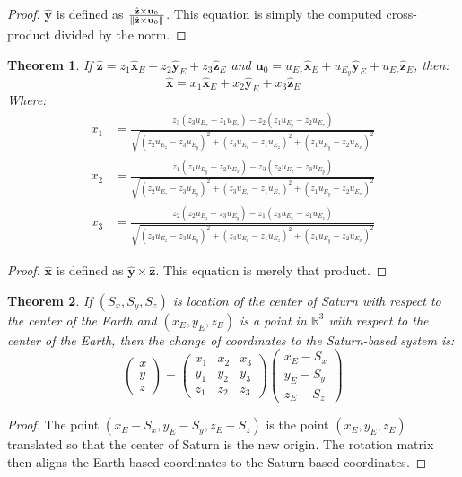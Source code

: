 \documentclass{article}
\theoremstyle{mystyle}
\newtheorem{theorem}{Theorem}[section]
\DeclarePairedDelimiter\norm{\lVert}{\rVert}
\begin{document}
\begin{proof}
$\hat{\mathbf{y}}$ is defined as $\frac{\hat{\mathbf{z}}\times \mathbf{u}_{0}}{\norm{\hat{\mathbf{z}}\times \mathbf{u}_{0}}}$. This equation is simply the computed cross-product divided by the norm.
\end{proof}
\begin{theorem}
If $\hat{\mathbf{z}} = z_1\hat{\mathbf{x}}_{E}+z_2\hat{\mathbf{y}}_{E}+z_3\hat{\mathbf{z}}_{E}$ and $\mathbf{u}_{0} = u_{E_{x}}\hat{\mathbf{x}}_{E}+u_{E_{y}}\hat{\mathbf{y}}_{E}+u_{E_{z}}\hat{\mathbf{z}}_{E}$, then:
\begin{equation*}
\hat{\mathbf{x}} = x_1 \hat{\mathbf{x}}_{E}+x_2\hat{\mathbf{y}}_{E}+x_3\hat{\mathbf{z}}_{E}
\end{equation*}
Where:
\begin{align*}
x_1 &= \frac{z_3(z_{3}u_{E_{x}}-z_1u_{E_{z}})-z_2(z_1u_{E_{y}}-z_2u_{E_{x}})}{\sqrt{(z_2u_{E_{z}}-z_3u_{E_{y}})^2+(z_3u_{E_{x}}-z_1u_{E_{z}})^2+(z_1u_{E_{y}}-z_2u_{E_{x}})^2}}\\
x_2 &= \frac{z_1(z_{1}u_{E_{y}}-z_{2}u_{E_{x}})-z_{3}(z_{2}u_{E_{z}}-z_{3}u_{E_{y}})}{\sqrt{(z_2u_{E_{z}}-z_3u_{E_{y}})^2+(z_3u_{E_{x}}-z_1u_{E_{z}})^2+(z_1u_{E_{y}}-z_2u_{E_{x}})^2}}\\
x_3 &= \frac{z_2(z_2u_{E_{z}}-z_3u_{E_{y}})-z_1(z_{3}u_{E_{x}}-z_{1}u_{E_{z}})}{\sqrt{(z_2u_{E_{z}}-z_3u_{E_{y}})^2+(z_3u_{E_{x}}-z_1u_{E_{z}})^2+(z_1u_{E_{y}}-z_2u_{E_{x}})^2}}
\end{align*}
\end{theorem}
\begin{proof}
$\hat{\mathbf{x}}$ is defined as $\hat{\mathbf{y}}\times \hat{\mathbf{z}}$. This equation is merely that product.
\end{proof}
\begin{theorem}
If $(S_x,S_y,S_z)$ is location of the center of Saturn with respect to the center of the Earth and $(x_{E},y_{E},z_{E})$ is a point in $\mathbb{R}^3$ with respect to the center of the Earth, then the change of coordinates to the Saturn-based system is:
\begin{equation*}
\begin{pmatrix} x\\y\\z \end{pmatrix} = \begin{pmatrix} x_1 & x_2 & x_3 \\ y_1 & y_2 & y_3 \\ z_1 & z_2 & z_3 \end{pmatrix} \begin{pmatrix} x_{E}-S_{x} \\ y_{E}-S_{y} \\ z_{E} - S_{z}\end{pmatrix}
\end{equation*}
\end{theorem}
\begin{proof}
The point $(x_{E}-S_{x}, y_{E}-S_{y}, z_{E}-S_{z})$ is the point $(x_{E},y_{E},z_{E})$ translated so that the center of Saturn is the new origin. The rotation matrix then aligns the Earth-based coordinates to the Saturn-based coordinates.
\end{proof}
\end{document}
